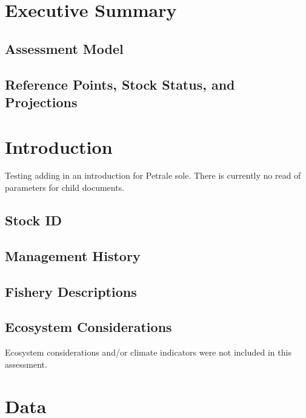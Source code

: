 \documentclass[
]{scrartcl}
\begin{document}
\newpage{}

\section{Executive Summary}\label{sec-exec-sum}

\subsection{Assessment Model}\label{assessment-model}

\subsection{Reference Points, Stock Status, and
Projections}\label{reference-points-stock-status-and-projections}

\newpage{}

\section{Introduction}\label{sec-intro}

Testing adding in an introduction for Petrale sole. There is currently
no read of parameters for child documents.

\subsection{Stock ID}\label{stock-id}

\subsection{Management History}\label{management-history}

\subsection{Fishery Descriptions}\label{fishery-descriptions}

\subsection{Ecosystem Considerations}\label{ecosystem-considerations}

Ecosystem considerations and/or climate indicators were not included in
this assessment.

\newpage{}

\section{Data}\label{sec-data}
\end{document}
